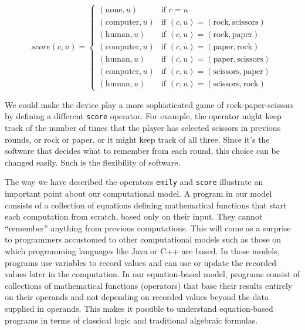 \begin{displaymath}
score(c,u) =
   \left\{
        \begin{array}{ll}
        (\mbox{none}, u)     & \mbox{if } c = u \\
        (\mbox{computer}, u) & \mbox{if } (c,u) = (\mbox{rock}, \mbox{scissors}) \\
        (\mbox{human}, u)    & \mbox{if } (c,u) = (\mbox{rock}, \mbox{paper}) \\
        (\mbox{computer}, u) & \mbox{if } (c,u) = (\mbox{paper}, \mbox{rock}) \\
        (\mbox{human}, u)    & \mbox{if } (c,u) = (\mbox{paper}, \mbox{scissors}) \\
        (\mbox{computer}, u) & \mbox{if } (c,u) = (\mbox{scissors}, \mbox{paper}) \\
        (\mbox{human}, u)    & \mbox{if } (c,u) = (\mbox{scissors}, \mbox{rock})
        \end{array}
   \right.
\end{displaymath}

We could make the device play a more sophisticated game of
rock-paper-scissors by defining a different \texttt{score} operator.
For example, the operator might
keep track of the number of times that the player has selected scissors
in previous rounds, or rock or paper, or it might keep track of all three.
Since it's the software that decides what to remember
from each round, this choice can be changed easily.
Such is the flexibility of software.

The way we have described the operators \texttt{emily} and \texttt{score}
illustrate an important point about our computational model.
A program in our model consists of a collection of equations
defining mathematical functions that start each computation from scratch,
based only on their input. They cannot ``remember'' anything from previous computations.
This will come as a surprise to programmers accustomed
to other computational models such as those on which
programming languages like Java or C++ are based.
In those models, programs use variables to record values
and can use or update the recorded values later in the computation.
In our equation-based model,
programs consist of collections of mathematical functions (operators)
that base their results entirely on their operands
and not depending on recorded values beyond the data supplied in operands.
This makes it possible to
understand equation-based programs in terms of classical
logic and traditional algebraic formulas.

